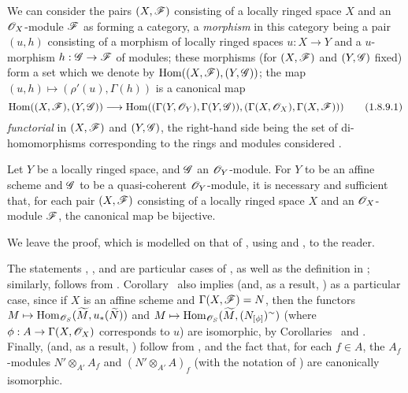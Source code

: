 \begin{env}[1.8.9]
\label{1.1.8.9}
We can consider the pairs $(X,\mathscr{F})$ consisting of a locally ringed space $X$ and an $\mathscr{O}_X$-module $\mathscr{F}$ as forming a category, a \emph{morphism} in this category being a pair $(u,h)$ consisting of a morphism of locally ringed spaces
$u:X\to Y$ and a $u$-morphism $h:\sh{G}\to\sh{F}$ of modules;
these morphisms (for $(X,\mathscr{F})$ and $(Y,\mathscr{G})$ fixed) form a set which we denote by ${\mathop{\mathrm{Hom}}\nolimits}((X,\mathscr{F}),(Y,\mathscr{G}))$;
the map $(u,h)\mapsto(\rho'(u),\Gamma(h))$ is a canonical map
\begin{equation*}
  \label{1.1.8.9.1}
  \Hom((X,\sh{F}),(Y,\sh{G}))\to\Hom((\Gamma(Y,\OO_Y),\Gamma(Y,\sh{G})),(\Gamma(X,\OO_X),\Gamma(X,\sh{F})))
  \tag{1.8.9.1}
\end{equation*}
\emph{functorial} in $(X,\mathscr{F})$ and $(Y,\mathscr{G})$, the right-hand side being the set of di-homomorphisms corresponding to the rings and modules considered .
\end{env}

\begin{cor}[1.8.10]
\label{1.1.8.10}
Let $Y$ be a locally ringed space, and $\mathscr{G}$ an $\mathscr{O}_Y$-module.
For $Y$ to be an affine scheme and $\mathscr{G}$ to be a quasi-coherent $\mathscr{O}_Y$-module, it is necessary and sufficient that, for each pair $(X,\mathscr{F})$ consisting of a locally ringed space $X$ and an $\mathscr{O}_X$-module $\mathscr{F}$, the canonical map  be bijective.
\end{cor}

We leave the proof, which is modelled on that of , using  and , to the reader.

\begin{rmk}[1.8.11]
\label{1.1.8.11}
The statements , , and  are particular cases of , as well as the definition in ;
similarly,  follows from .
Corollary~ also implies  (and, as a result, ) as a particular case, since if $X$ is an affine scheme and $\Gamma(X,\mathscr{F})=N$, then the functors $M\mapsto\Hom_{\OO_S}(\wt{M},u_*(\wt{N}))$ and $M\mapsto\Hom_{\OO_S}(\wt{M},(N_{[\vphi]})^\sim)$ (where $\vphi:A\to\Gamma(X,\OO_X)$ corresponds to $u$) are isomorphic, by Corollaries~ and .
Finally,  (and, as a result, ) follow from , and the fact that, for each $f\in A$, the $A_f$-modules $N'\otimes_{A'}A_f$ and $(N'\otimes_{A'}A)_f$ (with the notation of ) are canonically isomorphic.
\end{rmk}


